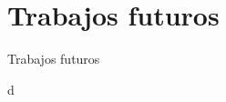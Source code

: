 \documentclass[spanish]{beamer}
\begin{document}
\section{Trabajos futuros}
\begin{frame}{Trabajos futuros}
\end{frame}
\begin{frame}{d}
\end{frame}
\end{document}

